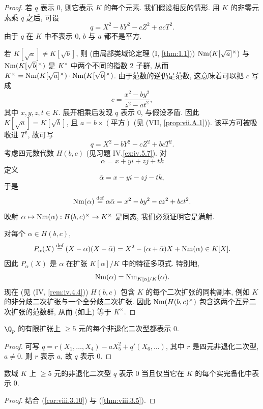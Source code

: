 \begin{proof}
若 $q$ 表示 $0$, 则它表示 $K$ 的每个元素. 我们假设相反的情形. 用 $K$ 的非零元素乘 $q$ 之后, 可设
\[
q=X^{2}-bY^{2}-cZ^{2}+acT^{2}.
\]
由于 $q$ 在 $K$ 中不表示 $0$, $b$ 与 $a$ 都不是平方.

若 $K[\sqrt{a}]\ne K[\sqrt{b}]$, 则 (由局部类域论定理 (I, \ref{thm:1.1})) $\operatorname{Nm}(K[\sqrt{a}]^{\times})$ 与 $\operatorname{Nm}(K[\sqrt{b}]^{\times})$ 是 $K^{\times}$ 中两个不同的指数 $2$ 子群, 从而 $K^{\times}=\operatorname{Nm}(K[\sqrt{a}]^{\times})\cdot\operatorname{Nm}(K[\sqrt{b}]^{\times})$. 由于范数的逆仍是范数, 这意味着可以把 $c$ 写成
\[
c=\frac{x^{2}-by^{2}}{z^{2}-at^{2}},
\]
其中 $x,y,z,t\in K$. 展开相乘后发现 $q$ 表示 $0$, 与假设矛盾. 因此 $K[\sqrt{a}]=K[\sqrt{b}]$, 且 $a=b\times(\text{平方})$ (见 (VII, \ref{prop:vii.A.1})). 该平方可被吸收进 $T^{2}$, 故可写
\[
q=X^{2}-bY^{2}-cZ^{2}+bcT^{2}.
\]
考虑四元数代数 $H(b,c)$ (见习题 IV.\ref{ex:iv.5.7}). 对
\[
\alpha=x+yi+zj+tk
\]
定义
\[
\bar{\alpha}=x-yi-zj-tk,
\]
于是
\[
\operatorname{Nm}(\alpha)\overset{\text{def}}{=}\alpha\bar{\alpha}=x^{2}-by^{2}-cz^{2}+bct^{2}.
\]
映射 $\alpha\mapsto\operatorname{Nm}(\alpha):H(b,c)^{\times}\to K^{\times}$ 是同态, 我们必须证明它是满射.

对每个 $\alpha\in H(b,c)$,
\[
P_{\alpha}(X)\overset{\text{def}}{=}(X-\alpha)(X-\bar{\alpha})=X^{2}-(\alpha+\bar{\alpha})X+\operatorname{Nm}(\alpha)\in K[X].
\]
因此 $P_{\alpha}(X)$ 是 $\alpha$ 在扩张 $K[\alpha]/K$ 中的特征多项式. 特别地,
\[
\operatorname{Nm}(\alpha)=\operatorname{Nm}_{K[\alpha]/K}(\alpha).
\]
现在 (见 (IV, \ref{rem:iv.4.4})) $H(b,c)$ 包含 $K$ 的每个二次扩张的同构副本, 例如 $K$ 的非分歧二次扩张与一个全分歧二次扩张. 因此 $\operatorname{Nm}(H(b,c)^{\times})$ 包含这两个互异二次扩张的范数群, 从而 (如上) 等于 $K^{\times}$.
\end{proof}

\begin{corollary}\label{cor:viii.3.10}
$\Q_p$ 的有限扩张上 $\ge 5$ 元的每个非退化二次型都表示 $0$.
\end{corollary}

\begin{proof}
可写 $q=r(X_1,\ldots,X_4)-aX_5^{2}+q'(X_6,\ldots)$, 其中 $r$ 是四元非退化二次型, $a\ne 0$. 则 $r$ 表示 $a$, 故 $q$ 表示 $0$.
\end{proof}

\begin{corollary}\label{cor:viii.3.11}
数域 $K$ 上 $\ge 5$ 元的非退化二次型 $q$ 表示 $0$ 当且仅当它在 $K$ 的每个实完备化中表示 $0$.
\end{corollary}

\begin{proof}
结合 (\ref{cor:viii.3.10}) 与 (\ref{thm:viii.3.5}).
\end{proof}

